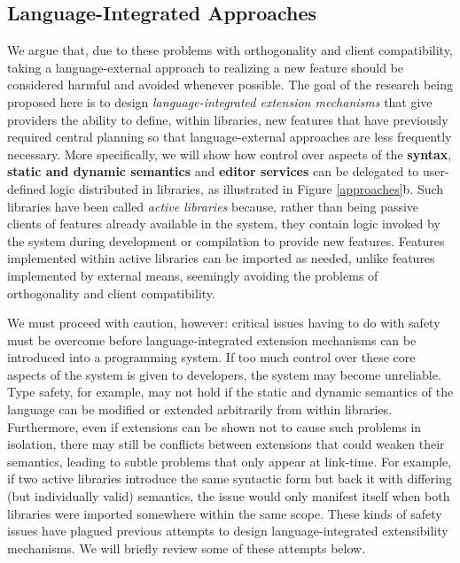 \subsection{Language-Integrated Approaches}\label{language-integrated-approaches}
We argue that, due to these problems with orthogonality and client compatibility, taking a language-external approach to realizing a new feature should be considered harmful and avoided whenever possible. The goal of the research being proposed here is to design \emph{language-integrated extension mechanisms} that give providers the ability to define, within libraries, new features that have previously required central planning
so that language-external approaches are less frequently necessary. More specifically, we will show how control over aspects of the \textbf{syntax}, \textbf{static and dynamic semantics} and \textbf{editor services} can be delegated to user-defined logic distributed in {libraries}, as illustrated in Figure \ref{approaches}b. 
Such libraries have been called \emph{active libraries}  \cite{activelibraries} because, rather than being passive clients of features already available in the system, they contain logic invoked by the system during development or compilation to provide new features. Features implemented within active libraries can be imported as needed, unlike features implemented by external means, seemingly avoiding the problems of orthogonality and client compatibility.

We must proceed with caution, however: critical issues having to do with {safety} must be overcome before language-integrated extension mechanisms can be introduced into a programming system. If too much control over  these core aspects of the system is given  to developers, the system may become unreliable. 
Type safety, for example, may not hold if the static and dynamic semantics of the language can be modified or extended arbitrarily from within libraries. Furthermore, even if extensions can be shown not to cause such problems in isolation, there may still be conflicts between extensions that could weaken their semantics, leading to subtle problems that only appear at link-time. For example, if two active libraries introduce the same syntactic form but back it with differing (but individually valid) semantics, the issue would only manifest itself when both libraries were imported somewhere within the same scope. These kinds of safety issues have plagued previous attempts to design language-integrated extensibility mechanisms. We will briefly review some of these attempts below.%


